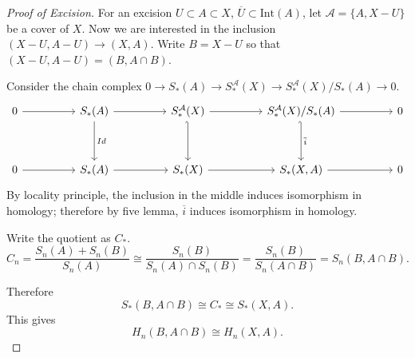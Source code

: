 \begin{proof}[Proof of Excision]
	For an excision  $U \subset A \subset X$, $\overline{U}  \subset \text{Int}(A)$, let $\mathcal{A} = \{A, X - U\} $ be a cover of $X$. Now we are interested in the inclusion $(X - U, A - U) \to (X, A)$. Write $B = X - U$ so that $(X - U, A - U) = (B, A \cap B)$.

	Consider the chain complex $0 \to S_*(A) \to S_*^{\mathcal{A}}(X) \to S_*^{\mathcal{A}}(X) / S_* (A) \to  0$.
\[\begin{tikzcd}
	0 && {S_*(A)} && {S_*^\mathcal{A}(X)} && {S_*^\mathcal{A}(X) / S_*(A)} && 0 \\
	\\
	0 && {S_*(A)} && {S_*(X)} && {S_*(X, A)} && 0
	\arrow[from=1-1, to=1-3]
	\arrow[from=1-3, to=1-5]
	\arrow[from=1-5, to=1-7]
	\arrow[from=1-7, to=1-9]
	\arrow[from=3-7, to=3-9]
	\arrow[from=3-5, to=3-7]
	\arrow[from=3-1, to=3-3]
	\arrow[from=3-3, to=3-5]
	\arrow["Id", from=1-3, to=3-3]
	\arrow[hook', from=1-5, to=3-5]
	\arrow["{\overline{i}}", hook', from=1-7, to=3-7]
\end{tikzcd}\]
By locality principle, the inclusion in the middle induces isomorphism in homology; therefore by five lemma, $\overline{i} $ induces isomorphism in homology.

Write the quotient as $C_*$.
\[
	C_n = \frac{S_n(A) + S_n(B)}{S_n(A)} \cong \frac{S_n(B)}{S_n(A) \cap S_n(B)}  = \frac{S_n(B)}{S_n(A \cap B)} = S_n(B, A \cap B)
.\] 

Therefore
\[
	S_*(B, A \cap B) \cong C_* \cong S_*(X, A)
.\] 
This gives
\[
	H_n(B, A \cap B) \cong H_n(X, A)
.\] 


\end{proof}

